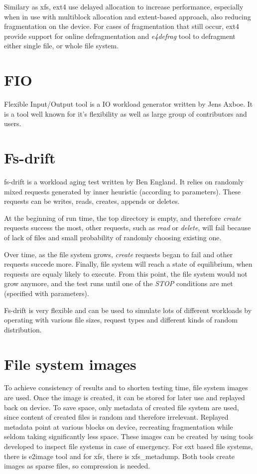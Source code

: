 \documentclass[
  color, %
  table, %
  lof,   %
  lot,   %
]{fithesis3}
\begin{document}

Similary as xfs, ext4 use delayed allocation to increase performance, especially when in use with multiblock allocation and extent-based approach, also reducing fragmentation on the device. For cases of fragmentation that still occur, ext4 provide support for online defragmentation and \textit{e4defrag} tool to defragment either single file, or whole file system.

\section{FIO}
Flexible Input/Output tool is a IO workload generator written by Jens Axboe. It is a tool well known for it's flexibility as well as large group of contributors and users.

\section{Fs-drift}
fs-drift is a workload aging test written by Ben England. It relies on randomly mixed requests generated by inner heuristic (according to parameters). These requests can be writes, reads, creates, appends or deletes.

At the beginning of run time, the top directory is empty, and therefore \textit{create} requests success the most, other requests, such as \textit{read} or \textit{delete}, will fail because of lack of files and small probability of randomly choosing existing one. 

Over time, as the file system grows, \textit{create} requests began to fail and other requests succede more. Finally, file system will reach a state of equilibrium, when requests are equaly likely to execute. From this point, the file system would not grow anymore, and the test runs until one of the \textit{STOP} conditions are met (specified with parameters).

Fs-drift is very flexible and can be used to simulate lots of different workloads by operating with various file sizes, request types and different kinds of random distribution.

\section{File system images}
To achieve consistency of results and to shorten testing time, file system images are used. Once the image is created, it can be stored for later use and replayed back on device. To save space, only metadata of created file system are used, since content of created files is random and therefore irrelevant. Replayed metadata point at various blocks on device, recreating fragmentation while seldom taking significantly less space. These images can be created by using tools developed to inspect file systems in case of emergency. For ext based file systems, there is e2image tool and for xfs, there is xfs\_metadump. Both tools create images as sparse files, so compression is needed.
\end{document}
